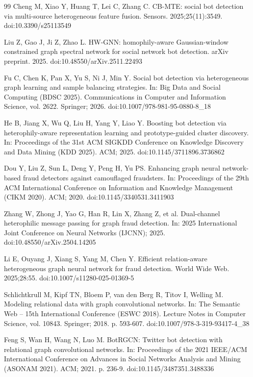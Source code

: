 \documentclass[fonts]{icst}
\begin{document}
\begin{thebibliography}{99}
Cheng M, Xiao Y, Huang T, Lei C, Zhang C. CB-MTE: social bot detection via multi-source heterogeneous feature fusion. Sensors. 2025;25(11):3549. doi:10.3390/s25113549

Liu Z, Gao J, Ji Z, Zhao L. HW-GNN: homophily-aware Gaussian-window constrained graph spectral network for social network bot detection. arXiv preprint. 2025. doi:10.48550/arXiv.2511.22493

Fu C, Chen K, Pan X, Yu S, Ni J, Min Y. Social bot detection via heterogeneous graph learning and sample balancing strategies. In: Big Data and Social Computing (BDSC 2025). Communications in Computer and Information Science, vol. 2622. Springer; 2026. doi:10.1007/978-981-95-0880-8\_18

He B, Jiang X, Wu Q, Liu H, Yang Y, Liao Y. Boosting bot detection via heterophily-aware representation learning and prototype-guided cluster discovery. In: Proceedings of the 31st ACM SIGKDD Conference on Knowledge Discovery and Data Mining (KDD 2025). ACM; 2025. doi:10.1145/3711896.3736862

Dou Y, Liu Z, Sun L, Deng Y, Peng H, Yu PS. Enhancing graph neural network-based fraud detectors against camouflaged fraudsters. In: Proceedings of the 29th ACM International Conference on Information and Knowledge Management (CIKM 2020). ACM; 2020. doi:10.1145/3340531.3411903

Zhang W, Zhong J, Yao G, Han R, Lin X, Zhang Z, et al. Dual-channel heterophilic message passing for graph fraud detection. In: 2025 International Joint Conference on Neural Networks (IJCNN); 2025. doi:10.48550/arXiv.2504.14205

Li E, Ouyang J, Xiang S, Yang M, Chen Y. Efficient relation-aware heterogeneous graph neural network for fraud detection. World Wide Web. 2025;28:55. doi:10.1007/s11280-025-01369-5

Schlichtkrull M, Kipf TN, Bloem P, van den Berg R, Titov I, Welling M. Modeling relational data with graph convolutional networks. In: The Semantic Web -- 15th International Conference (ESWC 2018). Lecture Notes in Computer Science, vol. 10843. Springer; 2018. p. 593-607. doi:10.1007/978-3-319-93417-4\_38

Feng S, Wan H, Wang N, Luo M. BotRGCN: Twitter bot detection with relational graph convolutional networks. In: Proceedings of the 2021 IEEE/ACM International Conference on Advances in Social Networks Analysis and Mining (ASONAM 2021). ACM; 2021. p. 236-9. doi:10.1145/3487351.3488336


\end{thebibliography}
\end{document}
